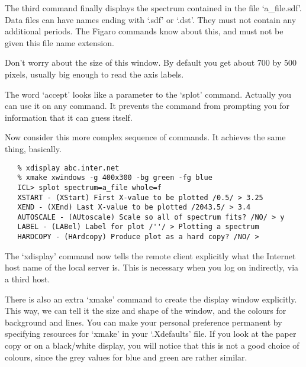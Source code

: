    The third command finally displays the spectrum contained in the file
   `a\_file.sdf'. Data files can have names ending with `.sdf' or
   `.dst'. They must not contain any additional periods. The Figaro
   commands know about this, and must not be given this file name
   extension.

   Don't worry about the size of this window. By default you get about
   700 by 500 pixels, usually big enough to read the axis labels.

   The word `accept' looks like a parameter to the `splot' command.
   Actually you can use it on any command. It prevents the command from
   prompting you for information that it can guess itself.

   Now consider this more complex sequence of commands. It achieves the
   same thing, basically.

\begin{verbatim}
   % xdisplay abc.inter.net
   % xmake xwindows -g 400x300 -bg green -fg blue
   ICL> splot spectrum=a_file whole=f
   XSTART - (XStart) First X-value to be plotted /0.5/ > 3.25
   XEND - (XEnd) Last X-value to be plotted /2043.5/ > 3.4
   AUTOSCALE - (AUtoscale) Scale so all of spectrum fits? /NO/ > y
   LABEL - (LABel) Label for plot /''/ > Plotting a spectrum
   HARDCOPY - (HArdcopy) Produce plot as a hard copy? /NO/ >
\end{verbatim}

\begin{latexonly}
\begin{figure}[htb]
\begin{center}
\leavevmode{}
\end{center}
\end{figure}
\end{latexonly}

   The `xdisplay' command now tells the remote client explicitly what
   the Internet host name of the local server is. This is necessary when
   you log on indirectly, via a third host.

   There is also an extra `xmake' command to create the display window
   explicitly. This way, we can tell it the size and shape of the
   window, and the colours for background and lines. You can make your
   personal preference permanent by specifying resources for `xmake'
   in your `.Xdefaults' file. If you look at the paper copy or on a
   black/white display, you will notice that this is not a good choice
   of colours, since the grey values for blue and green are rather
   similar.

